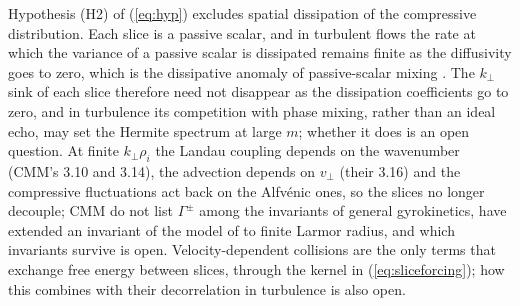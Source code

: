 Hypothesis (H2) of (\ref{eq:hyp}) excludes spatial dissipation of the compressive distribution. Each slice is a passive scalar, and in turbulent flows the rate at which the variance of a passive scalar is dissipated remains finite as the diffusivity goes to zero, which is the dissipative anomaly of passive-scalar mixing \citep{ShraimanSiggia2000,FalkovichGawedzkiVergassola2001}. The $k_\perp$ sink of each slice therefore need not disappear as the dissipation coefficients go to zero, and in turbulence its competition with phase mixing, rather than an ideal echo, may set the Hermite spectrum at large $m$; whether it does is an open question. At finite $k_\perp\rho_i$ the Landau coupling depends on the wavenumber (CMM's 3.10 and 3.14), the advection depends on $v_\perp$ (their 3.16) and the compressive fluctuations act back on the Alfv\'enic ones, so the slices no longer decouple; CMM do not list $\Gamma^\pm$ among the invariants of general gyrokinetics, \citet{CostelloPlunk2025} have extended an invariant of the model of \citet{Plunk2015} to finite Larmor radius, and which invariants survive is open. Velocity-dependent collisions are the only terms that exchange free energy between slices, through the kernel in (\ref{eq:sliceforcing}); how this combines with their decorrelation in turbulence is also open.

